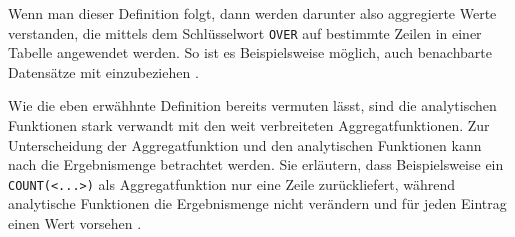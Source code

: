 Wenn man dieser Definition folgt, dann werden darunter also aggregierte Werte verstanden,
die mittels dem Schlüsselwort \texttt{OVER} auf bestimmte Zeilen in einer Tabelle
angewendet werden. So ist es Beispielsweise möglich, auch benachbarte Datensätze
mit einzubeziehen \citep[vgl.][]{oracle}.

Wie die eben erwähhnte Definition bereits vermuten lässt, sind die analytischen Funktionen
stark verwandt mit den weit verbreiteten Aggregatfunktionen. Zur Unterscheidung
der Aggregatfunktion und den analytischen Funktionen kann nach \citet[Seite 36]{Nuijten2023}
die Ergebnismenge betrachtet werden. Sie erläutern, dass Beispielsweise ein
\texttt{COUNT(<...>)} als Aggregatfunktion nur eine Zeile zurückliefert, während
analytische Funktionen die Ergebnismenge nicht verändern und für jeden Eintrag
einen Wert vorsehen \citep[vgl.][Seite 36]{Nuijten2023}.


